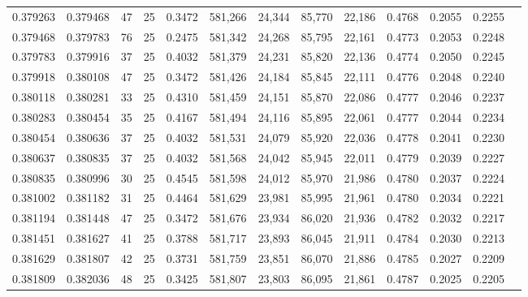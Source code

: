 \begin{tabular}{rrrrrrrrrrrrr}
0.379263 & 0.379468 &    47 &  25 &                                     0.3472 & 581,266 &  24,344 &  85,770 &  22,186 & 0.4768 & 0.2055 & 0.2255 \\
0.379468 & 0.379783 &    76 &  25 &                                     0.2475 & 581,342 &  24,268 &  85,795 &  22,161 & 0.4773 & 0.2053 & 0.2248 \\
0.379783 & 0.379916 &    37 &  25 &                                     0.4032 & 581,379 &  24,231 &  85,820 &  22,136 & 0.4774 & 0.2050 & 0.2245 \\
0.379918 & 0.380108 &    47 &  25 &                                     0.3472 & 581,426 &  24,184 &  85,845 &  22,111 & 0.4776 & 0.2048 & 0.2240 \\
0.380118 & 0.380281 &    33 &  25 &                                     0.4310 & 581,459 &  24,151 &  85,870 &  22,086 & 0.4777 & 0.2046 & 0.2237 \\
0.380283 & 0.380454 &    35 &  25 &                                     0.4167 & 581,494 &  24,116 &  85,895 &  22,061 & 0.4777 & 0.2044 & 0.2234 \\
0.380454 & 0.380636 &    37 &  25 &                                     0.4032 & 581,531 &  24,079 &  85,920 &  22,036 & 0.4778 & 0.2041 & 0.2230 \\
0.380637 & 0.380835 &    37 &  25 &                                     0.4032 & 581,568 &  24,042 &  85,945 &  22,011 & 0.4779 & 0.2039 & 0.2227 \\
0.380835 & 0.380996 &    30 &  25 &                                     0.4545 & 581,598 &  24,012 &  85,970 &  21,986 & 0.4780 & 0.2037 & 0.2224 \\
0.381002 & 0.381182 &    31 &  25 &                                     0.4464 & 581,629 &  23,981 &  85,995 &  21,961 & 0.4780 & 0.2034 & 0.2221 \\
0.381194 & 0.381448 &    47 &  25 &                                     0.3472 & 581,676 &  23,934 &  86,020 &  21,936 & 0.4782 & 0.2032 & 0.2217 \\
0.381451 & 0.381627 &    41 &  25 &                                     0.3788 & 581,717 &  23,893 &  86,045 &  21,911 & 0.4784 & 0.2030 & 0.2213 \\
0.381629 & 0.381807 &    42 &  25 &                                     0.3731 & 581,759 &  23,851 &  86,070 &  21,886 & 0.4785 & 0.2027 & 0.2209 \\
0.381809 & 0.382036 &    48 &  25 &                                     0.3425 & 581,807 &  23,803 &  86,095 &  21,861 & 0.4787 & 0.2025 & 0.2205 \\

\end{tabular}

